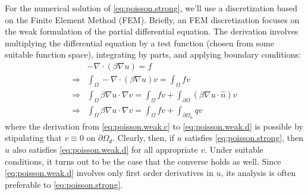 For the numerical solution of \eqref{eq:poisson.strong}, we'll use a discretization based on the Finite Element Method (FEM). Briefly, an FEM discretization focuses on the weak formulation of the partial differential equation. The derivation involves multiplying the differential equation by a test function (chosen from some suitable function space), integrating by parts, and applying boundary conditions:
\begin{subequations}
\begin{align}
& -\nabla \cdot \left( \beta \nabla u \right) = f \\
\Rightarrow & \int_{\Omega} -\nabla \cdot \left( \beta \nabla u \right) v = \int_{\Omega} f v \\
\Rightarrow & \int_{\Omega} \beta \nabla u \cdot \nabla v =
    \int_{\Omega} f v + \int_{\partial \Omega} \left( \beta \nabla u \cdot \hat{n} \right) v \label{eq:poisson.weak.c} \\
\Rightarrow & \int_{\Omega} \beta \nabla u \cdot \nabla v = \int_{\Omega} f v + \int_{\partial \Omega_n} q v \label{eq:poisson.weak.d}
\end{align}
\end{subequations}
where the derivation from \eqref{eq:poisson.weak.c} to \eqref{eq:poisson.weak.d} is possible by stipulating that $v \equiv 0$ on $\partial \Omega_d$. Clearly, then, if $u$ satisfies \eqref{eq:poisson.strong}, then $u$ also satisfies \eqref{eq:poisson.weak.d} for all appropriate $v$. Under suitable conditions, it turns out to be the case that the converse holds as well. Since \eqref{eq:poisson.weak.d} involves only first order derivatives in $u$, its analysis is often preferable to \eqref{eq:poisson.strong}.


